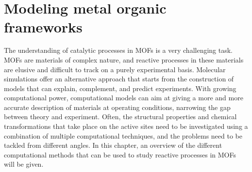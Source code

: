 \graphicspath{{figures/chapter2/}}
\renewcommand\evenpagerightmark{{\scshape\small Modeling metal organic frameworks}} 
\renewcommand\oddpageleftmark{{\scshape\small Chapter 2}}


\hyphenation{}

\chapter[Modeling metal organic frameworks]%
{Modeling metal organic frameworks}
\label{ch2}

The understanding of catalytic processes in MOFs is a very challenging task. MOFs are materials of complex nature, and reactive processes in these materials are elusive and difficult to track on a purely experimental basis. Molecular simulations offer an alternative approach that starts from the construction of models that can explain, complement, and predict experiments. With growing computational power, computational models can aim at giving a more and more accurate description of materials at operating conditions, narrowing the gap between theory and experiment. Often, the structural properties and chemical transformations that take place on the active sites need to be investigated using a combination of multiple computational techniques, and the problems need to be tackled from different angles. 
In this chapter, an overview of the different computational methods that can be used to study reactive processes in MOFs will be given. 

